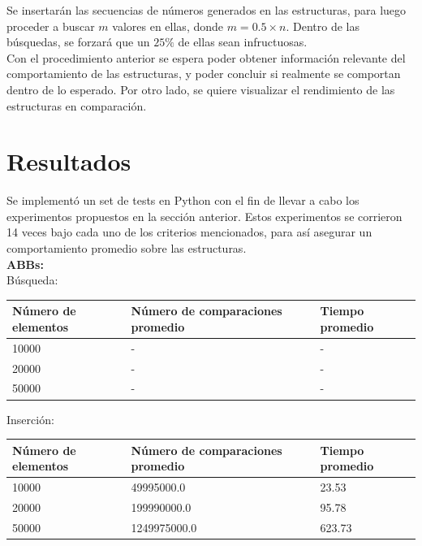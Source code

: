 \documentclass[11pt,letterpaper]{article}
\begin{document}
Se insertarán las secuencias de números generados en las estructuras, para luego proceder a buscar $m$ valores en ellas, donde $m = 0.5 \times n$. Dentro de las búsquedas, se forzará que un $25\%$ de ellas sean infructuosas.\\

Con el procedimiento anterior se espera poder obtener información relevante del comportamiento de las estructuras, y poder concluir si realmente se comportan dentro de lo esperado. Por otro lado, se quiere visualizar el rendimiento de las estructuras en comparación.

\newpage
\section{Resultados}

Se implementó un set de tests en Python con el fin de llevar a cabo los experimentos propuestos en la sección anterior. Estos experimentos se corrieron 14 veces bajo cada uno de los criterios mencionados, para así asegurar un comportamiento promedio sobre las estructuras.\\

\textbf{ABBs:}\\

Búsqueda:

\begin{center}
    \begin{tabular}{| l | l | l |}
    \hline
    \textbf{Número de elementos} & \textbf{Número de comparaciones promedio} & \textbf{Tiempo promedio} \\
    \hline
    10000 & - & -\\
    \hline
    20000 & - & -\\
    \hline
    50000 & - & -\\
    \hline
    \end{tabular}
\end{center}

Inserción:

\begin{center}
    \begin{tabular}{| l | l | l |}
    \hline
    \textbf{Número de elementos} & \textbf{Número de comparaciones promedio} & \textbf{Tiempo promedio} \\
    \hline
    10000 & 49995000.0 & 23.53\\
    \hline
    20000 & 199990000.0 & 95.78\\
    \hline
    50000 & 1249975000.0 & 623.73\\
    \hline
    \end{tabular}
\end{center}
\end{document}
